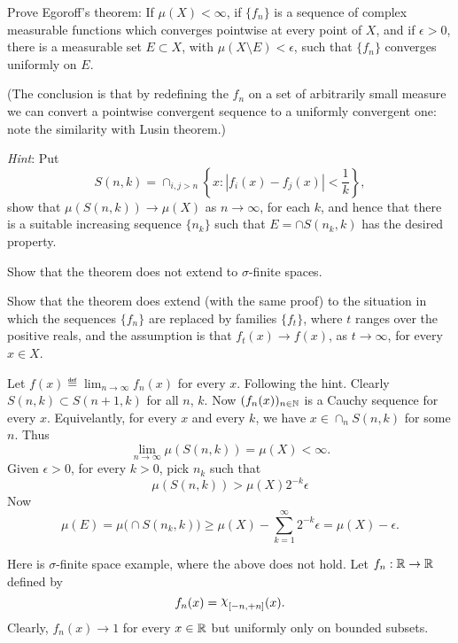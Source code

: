 \begin{enumerate}
\begin{excopy}
Prove
Egoroff's theorem: If \(\mu(X)<\infty\), if \(\{f_n\}\) is a sequence of complex
measurable functions which converges pointwise at every point of $X$,
and if \(\epsilon > 0\), there is a measurable set \(E\subset X\), with
\(\mu(X\setminus E)<\epsilon\), such that \(\{f_n\}\)
converges uniformly on $E$.

(The conclusion is that by redefining the \(f_n\) on a set of arbitrarily small
measure we can convert a pointwise convergent sequence to a uniformly
convergent one: note the similarity with
Lusin theorem.)

\qquad\emph{Hint}: Put
\begin{equation*}
 S(n,k) = \cap_{i,j>n} \left\{x: |f_i(x) - f_j(x)| < \frac{1}{k}\right\},
\end{equation*}
show that \(\mu(S(n,k))\to \mu(X)\) as \(n\to\infty\), for each $k$,
and hence that there is a suitable increasing sequence \(\{n_k\}\) such that
\(E = \cap S(n_k,k)\) has the desired property.

Show that the theorem does not extend to \(\sigma\)-finite spaces.

Show that the theorem does extend (with the same proof)
to the situation in which the sequences \(\{f_n\}\) are replaced by families
\(\{f_t\}\), where $t$ ranges over the positive reals, and the assumption
is that \(f_t(x) \to f(x)\), as \(t\to\infty\), for every \(x\in X\).
\end{excopy}

Let \(f(x) \eqdef \lim_{n\to\infty} f_n(x)\) for every $x$.
Following the hint. Clearly \(S(n,k)\subset S(n+1,k)\) for all $n$, $k$.
Now \((f_n(x))_{n\in\mathbb{N}}\) is a Cauchy sequence for every $x$.
Equivelantly,
for every $x$ and every $k$, we have \(x\in\cap_n S(n,k)\) for some $n$.
Thus
\begin{equation*}
\lim_{n\to\infty}\mu(S(n,k)) = \mu(X) < \infty.
\end{equation*}
Given \(\epsilon > 0\), for every \(k>0\), pick \(n_k\) such that
\begin{equation*}
\mu(S(n,k)) > \mu(X) 2^{-k}\epsilon
\end{equation*}
Now
\begin{equation*}
\mu(E)
 =  \mu\bigl(\cap S(n_k,k)\bigr)
 \geq \mu(X) - \sum_{k=1}^\infty 2^{-k}\epsilon
 = \mu(X) - \epsilon.
\end{equation*}

Here is \(\sigma\)-finite space example,
where the above does not hold.
Let \(f_n:\mathbb{R}\to\mathbb{R}\) defined by
\begin{equation*}
 f_n(x) = \chhi_{[-n,+n]}(x).
\end{equation*}
Clearly, \(f_n(x) \to 1 \) for every \(x\in \mathbb{R}\) but uniformly
only on bounded subsets.


\end{enumerate}
